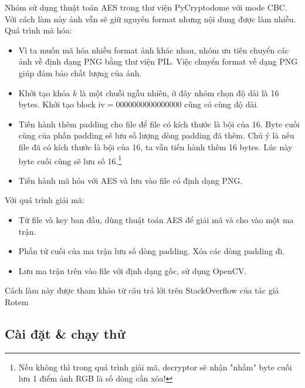 \documentclass[12pt]{article}
\begin{document}
Nhóm sử dụng thuật toán AES trong thư viện PyCryptodome với mode CBC. Với cách làm này ảnh vẫn sẽ giữ nguyên format nhưng nội dung được làm nhiễu. Quá trình mã hóa:
\begin{itemize}
\item Vì ta muốn mã hóa nhiều format ảnh khác nhau, nhóm ưu tiên chuyển các ảnh về định dạng PNG bằng thư viện PIL. Việc chuyển format về dạng PNG giúp đảm bảo chất lượng của ảnh.
\item Khởi tạo khóa $k$ là một chuỗi ngẫu nhiên, ở đây nhóm chọn độ dài là 16 bytes. Khởi tạo block $\text{iv} = 0000000000000000$ cũng có cùng độ dài.
\item Tiến hành thêm padding cho file để file có kích thước là bội của 16. Byte cuối cùng của phần padding sẽ lưu số lượng dòng padding đã thêm. Chú ý là nếu file đã có kích thước là bội của 16, ta vẫn tiến hành thêm 16 bytes. Lúc này byte cuối cùng sẽ lưu số 16.\footnote{Nếu không thì trong quá trình giải mã, decryptor sẽ nhận "nhầm" byte cuối lưu 1 điểm ảnh RGB là số dòng cần xóa!}
\item Tiến hành mã hóa với AES và lưu vào file có định dạng PNG.
\end{itemize}
Với quá trình giải mã:
\begin{itemize}
\item Từ file và key ban đầu, dùng thuật toán AES để giải mã và cho vào một ma trận.
\item Phần tử cuối của ma trận lưu số dòng padding. Xóa các dòng padding đi.
\item Lưu ma trận trên vào file với định dạng gốc, sử dụng OpenCV.
\end{itemize}
Cách làm này được tham khảo từ câu trả lời trên StackOverflow của tác giả Rotem\cite{68046596}

\subsection{Cài đặt \& chạy thử}\label{caidatchaythu_subsec}
\end{document}
